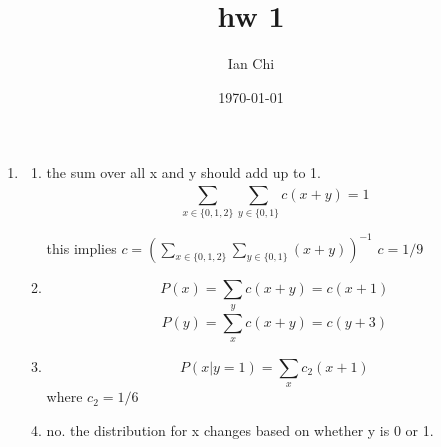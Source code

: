 \documentclass{article}
\title{hw 1}
\author{Ian Chi}
\date{\today}
\begin{document}
\maketitle

\begin{enumerate}
    \item \begin{enumerate}
        \item the sum over all x and y should add up to 1. 
        \begin{equation}
            \sum_{x\in\{0,1,2\}}^{}\sum_{y\in\{0,1\}}^{}c(x+y) = 1
        \end{equation}

        this implies \(c =\left( \sum_{x\in\{0,1,2\}}^{}\sum_{y\in\{0,1\}}^{}(x+y) \right)^{-1}\)
        \(c = 1/9\)


        \item \begin{equation}
            P(x) = \sum_{y}^{} c(x+y) = c(x+1)
        \end{equation}
        \begin{equation}
            P(y) = \sum_{x}^{} c(x+y) = c(y+3)
        \end{equation}
        \item \begin{equation}
            P(x|y=1) = \sum_{x}^{}c_2(x+1)
        \end{equation}
        where \(c_2 = 1/6\)

        \item no. the distribution for x changes based on whether y is 0 or 1.


    \end{enumerate}


\end{enumerate}
\end{document}
